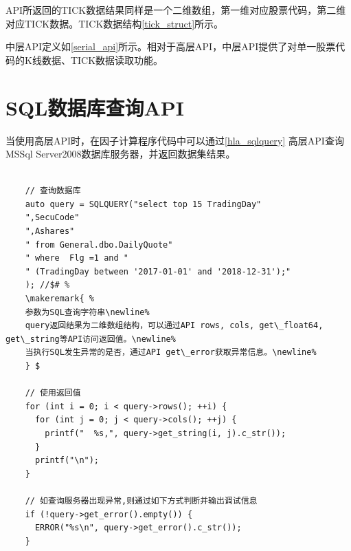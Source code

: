 

API所返回的TICK数据结果同样是一个二维数组，第一维对应股票代码，第二维对应TICK数据。TICK数据结构\ref{tick_struct}所示。




\highlevelapiend

中层API定义如\ref{serial_api}所示。相对于高层API，中层API提供了对单一股票代码的K线数据、TICK数据读取功能。




\section{SQL数据库查询API}

当使用高层API时，在因子计算程序代码中可以通过\ref{hla_sqlquery} 高层API查询MSSql Server2008数据库服务器，并返回数据集结果。

\begin{lstlisting}[label={hla_sqlquery},caption=高层API接口, morekeywords={SQLQUERY,ERROR}]

    // 查询数据库
    auto query = SQLQUERY("select top 15 TradingDay"
    ",SecuCode"
    ",Ashares"
    " from General.dbo.DailyQuote"
    " where  Flg =1 and "
    " (TradingDay between '2017-01-01' and '2018-12-31');"
    ); //$# %
    \makeremark{ %
    参数为SQL查询字符串\newline%
    query返回结果为二维数组结构，可以通过API rows, cols, get\_float64, get\_string等API访问返回值。\newline%
    当执行SQL发生异常的是否，通过API get\_error获取异常信息。\newline%
    } $

    // 使用返回值
    for (int i = 0; i < query->rows(); ++i) {
      for (int j = 0; j < query->cols(); ++j) {
        printf("  %s,", query->get_string(i, j).c_str());
      }
      printf("\n");
    }

    // 如查询服务器出现异常,则通过如下方式判断并输出调试信息
    if (!query->get_error().empty()) {
      ERROR("%s\n", query->get_error().c_str());
    }

\end{lstlisting}
\showremarks\hspace*{0mm}

